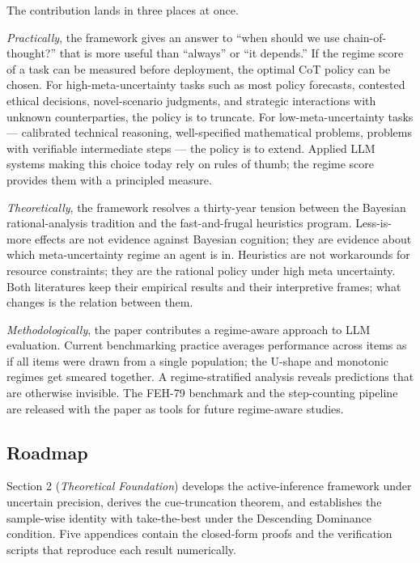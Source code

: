 \documentclass{article}
\begin{document}
The contribution lands in three places at once.

\emph{Practically}, the framework gives an answer to ``when should we
use chain-of-thought?'' that is more useful than ``always'' or ``it
depends.'' If the regime score of a task can be measured before
deployment, the optimal CoT policy can be chosen. For
high-meta-uncertainty tasks such as most policy forecasts, contested
ethical decisions, novel-scenario judgments, and strategic interactions
with unknown counterparties, the policy is to truncate. For
low-meta-uncertainty tasks --- calibrated technical reasoning,
well-specified mathematical problems, problems with verifiable
intermediate steps --- the policy is to extend. Applied LLM systems
making this choice today rely on rules of thumb; the regime score
provides them with a principled measure.

\emph{Theoretically}, the framework resolves a thirty-year tension
between the Bayesian rational-analysis tradition and the fast-and-frugal
heuristics program. Less-is-more effects are not evidence against
Bayesian cognition; they are evidence about which meta-uncertainty
regime an agent is in. Heuristics are not workarounds for resource
constraints; they are the rational policy under high meta uncertainty.
Both literatures keep their empirical results and their interpretive
frames; what changes is the relation between them.

\emph{Methodologically}, the paper contributes a regime-aware approach
to LLM evaluation. Current benchmarking practice averages performance
across items as if all items were drawn from a single population; the
U-shape and monotonic regimes get smeared together. A regime-stratified
analysis reveals predictions that are otherwise invisible. The FEH-79
benchmark and the step-counting pipeline are released with the paper as
tools for future regime-aware studies.

\subsection{Roadmap}\label{roadmap}

Section 2 (\emph{Theoretical Foundation}) develops the active-inference
framework under uncertain precision, derives the cue-truncation theorem,
and establishes the sample-wise identity with take-the-best under the
Descending Dominance condition. Five appendices contain the closed-form
proofs and the verification scripts that reproduce each result
numerically.
\end{document}
